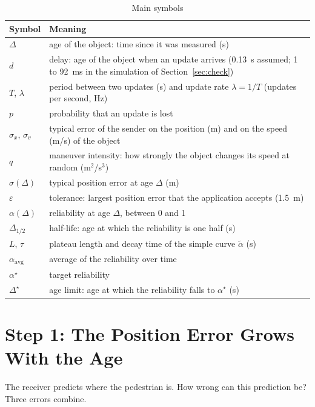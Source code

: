\documentclass[conference]{IEEEtran}
\newcommand{\at}{\alpha^{\star}}             %
\newcommand{\Dl}{\Delta^{\star}}             %
\newcommand{\aav}{\alpha_{\mathrm{avg}}}     %
\newcommand{\as}{\tilde{\alpha}}             %
\newcommand{\Dh}{\Delta_{1/2}}               %
\begin{document}
\begin{table}[t]
\caption{Main symbols}
\label{tab:notation}
\centering
\begin{tabular}{@{}l@{\hspace{0.9em}}p{}@{}}
\toprule
Symbol & Meaning \\
\midrule
$\Delta$ & age of the object: time since it was measured (s) \\
$d$ & delay: age of the object when an update arrives (0.13~s assumed; 1 to 92~ms in the simulation of Section~\ref{sec:check}) \\
$T$, $\lambda$ & period between two updates (s) and update rate
$\lambda=1/T$ (updates per second, Hz) \\
$p$ & probability that an update is lost \\
$\sigma_x$, $\sigma_v$ & typical error of the sender on the position (m) and
on the speed (m/s) of the object \\
$q$ & maneuver intensity: how strongly the object changes its speed at random
(m$^2$/s$^3$) \\
$\sigma(\Delta)$ & typical position error at age $\Delta$ (m) \\
$\varepsilon$ & tolerance: largest position error that the application
accepts (1.5~m) \\
$\alpha(\Delta)$ & reliability at age $\Delta$, between 0 and 1 \\
$\Dh$ & half-life: age at which the reliability is one half (s) \\
$L$, $\tau$ & plateau length and decay time of the simple curve $\as$ (s) \\
$\aav$ & average of the reliability over time \\
$\at$ & target reliability \\
$\Dl$ & age limit: age at which the reliability falls to $\at$ (s) \\
\bottomrule
\end{tabular}
\end{table}

\section{Step 1: The Position Error Grows With the Age}\label{sec:step1}

The receiver predicts where the pedestrian is. How wrong can this prediction
be? Three errors combine.
\end{document}
